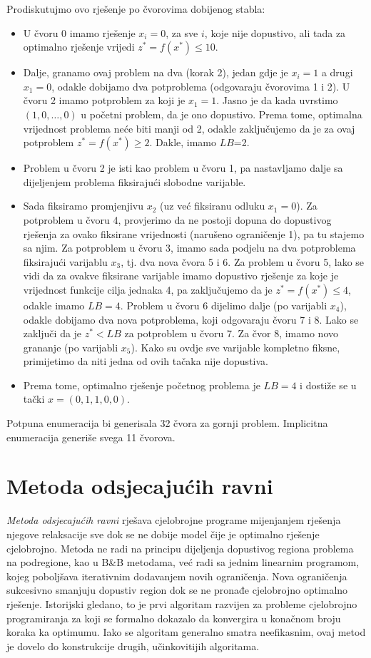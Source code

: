 \documentclass[a4paper, utf8, 11pt, colorlinks]{book}
\begin{document}
Prodiskutujmo ovo rješenje po čvorovima dobijenog stabla:
  \begin{itemize}
      \item U čvoru 0 imamo  rješenje $x_i = 0$, za sve $i$, koje  nije dopustivo, ali  tada za optimalno rješenje vrijedi $z^*=f(x^*) \leq 10$.
      \item  Dalje, granamo ovaj problem na dva (korak 2), jedan gdje je $x_i=1$ a drugi $x_1=0$, odakle dobijamo dva potproblema (odgovaraju čvorovima 1 i 2). U čvoru 2 imamo potproblem za koji je $x_1=1$. Jasno je da kada uvrstimo $(1,0, \ldots, 0)$ u početni problem, da je ono dopustivo. Prema tome, optimalna vrijednost problema neće biti manji od 2, odakle zaključujemo da je za ovaj potproblem $z^*=f(x^*) \geq 2$. Dakle, imamo $LB$=2. 
      \item Problem u čvoru 2 je isti kao problem u čvoru 1, pa nastavljamo dalje sa dijeljenjem problema fiksirajući slobodne varijable. 
      \item Sada fiksiramo promjenjivu $x_2$ (uz već fiksiranu odluku $x_1=0$). 
            Za potproblem u čvoru 4, provjerimo da ne postoji dopuna do dopustivog rješenja za ovako fiksirane vrijednosti (narušeno ograničenje 1), pa tu stajemo sa njim. Za potproblem u čvoru 3, imamo sada podjelu na dva potproblema fiksirajući varijablu $x_3$, tj. dva   nova čvora 5 i 6. Za problem u čvoru 5, lako se vidi da za ovakve fiksirane varijable imamo dopustivo rješenje za koje je vrijednost funkcije cilja jednaka 4, pa zaključujemo da je $z^*=f(x^*) \leq 4$, odakle imamo $LB=4$. Problem u čvoru 6 dijelimo dalje (po varijabli $x_4$), odakle dobijamo dva nova potproblema, koji odgovaraju čvoru 7 i 8. Lako se zaključi da je $z^*<LB$ za   potproblem u čvoru 7.  Za čvor 8, imamo novo grananje (po varijabli $x_5$). Kako su ovdje sve varijable kompletno fiksne, primijetimo da niti jedna od ovih tačaka  nije dopustiva.
            \item Prema tome, optimalno rješenje početnog problema je $LB=4$ i dostiže se u tački $x=(0, 1, 1, 0, 0)$. 
  \end{itemize}
  Potpuna enumeracija bi generisala 32 čvora za gornji problem. Implicitna enumeracija generiše svega 11 čvorova. 
 
\section{Metoda odsjecajućih ravni}
  
\emph{Metoda odsjecajućih ravni} rješava cjelobrojne programe mijenjanjem rješenja njegove relaksacije sve dok se ne dobije model čije je optimalno rješenje cjelobrojno. Metoda ne radi  na principu dijeljenja dopustivog regiona problema na podregione, kao u B\&B metodama, već radi sa jednim linearnim programom, kojeg poboljšava iterativnim dodavanjem novih ograničenja. Nova ograničenja sukcesivno smanjuju dopustiv region dok se ne pronađe cjelobrojno optimalno rješenje.   
 Istorijski gledano, to je prvi algoritam razvijen za probleme cjelobrojno programiranja za koji se formalno dokazalo da konvergira u konačnom broju
koraka ka optimumu. Iako se algoritam generalno smatra   neefikasnim, ovaj metod je dovelo do konstrukcije drugih, učinkovitijih algoritama.  
  
\end{document}
